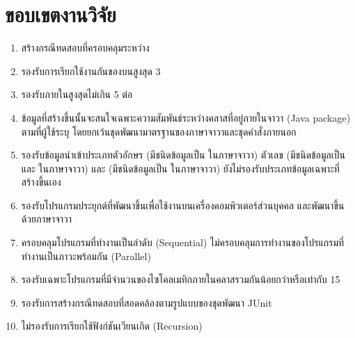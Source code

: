 \section{ขอบเขตงานวิจัย}
\label{sec:limitation}

\begin{enumerate}
    \label{enu:limitation}
    \item สร้างกรณีทดสอบที่ครอบคลุม{\TestPath}ระหว่าง{\CUT} \label{enu:lim:tc}
    \item รองรับการเรียกใช้งานกันของ{\CUT}บน{\TestPath}สูงสุด 3 {\class} \label{enu:lim:3linkingclass}
    \item รองรับ{\method}ภายใน{\CUT}สูงสุดไม่เกิน 5 {\method}ต่อ{\class} \label{enu:lim:5methods}
    \item ข้อมูล{\scg}ที่สร้างขึ้นนั้นจะสนใจเฉพาะความสัมพันธ์ระหว่างคลาสที่อยู่ภายใน{\Package}จาวา (Java package) ตามที่ผู้ใช้ระบุ 
        โดยยกเว้นชุดพัฒนามาตรฐานของภาษาจาวาและชุดคำสั่งภายนอก \label{enu:lim:scg}
    \item รองรับข้อมูลนำเข้าประเภทตัวอักษร (มีชนิดข้อมูลเป็น  ในภาษาจาวา) ตัวเลข 
        (มีชนิดข้อมูลเป็น  และ  ในภาษาจาวา) และ{\enum} 
        (มีชนิดข้อมูลเป็น  ในภาษาจาวา) ยังไม่รองรับประเภทข้อมูลเฉพาะที่สร้างขึ้นเอง \label{enu:lim:datatype}
    \item รองรับโปรแกรมประยุกต์ที่พัฒนาขึ้นเพื่อใช้งานบนเครื่องคอมพิวเตอร์ส่วนบุคคล และ{\sourcecode}พัฒนาขึ้นด้วยภาษาจาวา  \label{enu:lim:datatype}
    \item ครอบคลุมโปรแกรมที่ทำงานเป็นลำดับ (Sequential) ไม่ครอบคลุมการทำงานของโปรแกรมที่ทำงานเป็นภาวะพร้อมกัน (Parallel) \label{enu:lim:seq}
    \item รองรับเฉพาะโปรแกรมที่มีจำนวนของไซโคลเมทิกภายในคลาสรวมกันน้อยกว่าหรือเท่ากับ 15
    \item รองรับการสร้างกรณีทดสอบที่สอดคล้องตามรูปแบบของชุดพัฒนา JUnit
    \item ไม่รองรับการเรียกใช้ฟังก์ชันเวียนเกิด (Recursion)
\end{enumerate}
